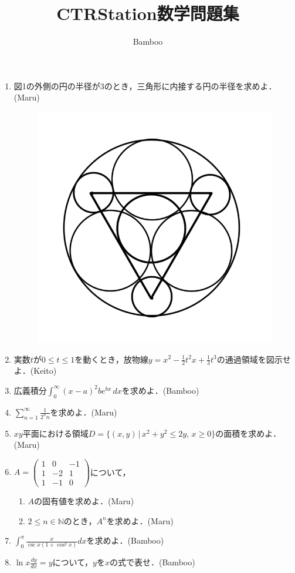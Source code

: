 \documentclass{ltjsarticle}
\title{CTRStation数学問題集}
\author{Bamboo}
\begin{document}
\maketitle

\begin{enumerate}
  \setlength{\parskip}{4cm}
  \everymath{\displaystyle}

  \item 図1の外側の円の半径が3のとき，三角形に内接する円の半径を求めよ．(Maru)

  \begin{figure}[htbp]
  \centering
  \includegraphics[scale=0.3]{radius.png}
  \caption{}
  \end{figure}

  \item 実数$t$が$0\le t\le1$を動くとき，放物線$y=x^2-\frac{1}{2}t^2x+\frac{1}{3}t^3$の通過領域を図示せよ．(Keito)
  \item 広義積分$\int_{0}^{∞}(x-a)^2be^{bx}\,dx$を求めよ．(Bamboo)
  \item $\sum_{n=1}^\infty \frac{1}{2^nn}$を求めよ．(Maru)
  \item $xy$平面における領域$D=\{(x,y)\,|\,x^2+y^2\le2y,\,x\ge0\}$の面積を求めよ．(Maru)

  \item $A=\begin{pmatrix}
    1 & 0 & -1 \\
    1 & -2 & 1 \\
    1 & -1 & 0
  \end{pmatrix}$について，
  \setlength{\parskip}{1.8cm}
  \begin{enumerate}
    \setlength{\parskip}{4cm}
    \item $A$の固有値を求めよ．(Maru)
    \item $2\le n\in \mathbb{N}$のとき，$A^n$を求めよ．(Maru)
  \end{enumerate}

  \setlength{\parskip}{4cm}

  \item $\int_{0}^{\pi}\frac{x}{\csc x(1+\cos ^2 x)}dx$を求めよ．(Bamboo)
  \item $\ln x\frac{dy}{dx}=y$について，$y$を$x$の式で表せ．(Bamboo)

\end{enumerate}
\end{document}
